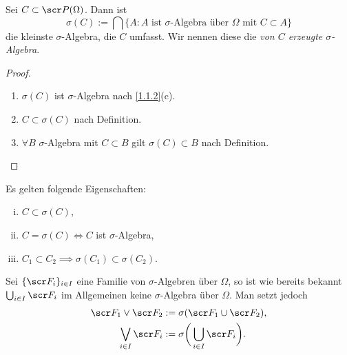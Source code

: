 \begin{lem} \label{1.1.3}
	Sei $C \subset \scr P(\Omega)$.
	Dann ist
	\[
		\sigma(C)
		:= \bigcap \Big\{ A : \text{$A$ ist $\sigma$-Algebra über $\Omega$ mit $C \subset A$} \Big\}
	\]
	die kleinste $\sigma$-Algebra, die $C$ umfasst.
	Wir nennen diese die \emph{von $C$ erzeugte $\sigma$-Algebra}.
	\begin{proof}
		\begin{enumerate}[1)]
			\item
				$\sigma(C)$ ist $\sigma$-Algebra nach \ref{1.1.2}(c).
			\item
				$C \subset \sigma(C)$ nach Definition.
			\item
				$\forall B$ $\sigma$-Algebra mit $C \subset B$ gilt $\sigma(C) \subset B$ nach Definition.
		\end{enumerate}
	\end{proof}
\end{lem}

\begin{nt} \label{1.1.4}
	Es gelten folgende Eigenschaften:
	\begin{enumerate}[(i)]
		\item
			$C \subset \sigma(C)$,
		\item
			$C = \sigma(C) \iff C$ ist $\sigma$-Algebra,
		\item
			$C_1 \subset C_2 \implies \sigma(C_1) \subset \sigma(C_2)$.
	\end{enumerate}
\end{nt}

\begin{nt} \label{1.1.5}
	Sei $\{\scr F_i\}_{i\in I}$ eine Familie von $\sigma$-Algebren über $\Omega$, so ist wie bereits bekannt $\bigcup_{i\in I} \scr F_i$ im Allgemeinen keine $\sigma$-Algebra über $\Omega$.
	Man setzt jedoch
	\begin{align*}
		\scr F_1 \vee \scr F_2 &:= \sigma(\scr F_1 \cup \scr F_2), \\
		\bigvee_{i\in I} \scr F_i &:= \sigma\bigg( \bigcup_{i\in I} \scr F_i \bigg).
	\end{align*}
\end{nt}

